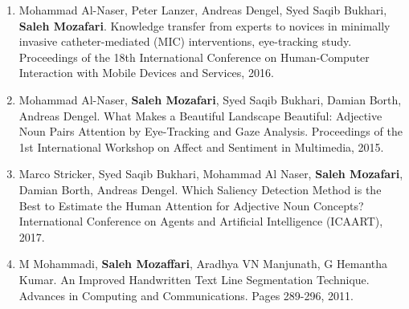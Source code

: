 \begin{enumerate}
	\item Mohammad Al-Naser, Peter Lanzer, Andreas Dengel, Syed Saqib Bukhari, \textbf{Saleh Mozafari}.  Knowledge transfer from experts to novices in minimally invasive catheter-mediated (MIC) interventions, eye-tracking study. Proceedings of the 18th International Conference on Human-Computer Interaction with Mobile Devices and Services, 2016.
	\item Mohammad Al-Naser, \textbf{Saleh Mozafari}, Syed Saqib Bukhari, Damian Borth, Andreas Dengel. What Makes a Beautiful Landscape Beautiful: Adjective Noun Pairs Attention by Eye-Tracking and Gaze Analysis. Proceedings of the 1st International Workshop on Affect and Sentiment in Multimedia, 2015.
	\item Marco Stricker, Syed Saqib Bukhari, Mohammad Al Naser, \textbf{Saleh Mozafari}, Damian Borth, Andreas Dengel.  Which Saliency Detection Method is the Best to Estimate the Human Attention for Adjective Noun Concepts? International Conference on Agents and Artificial Intelligence (ICAART), 2017.
	\item M Mohammadi, \textbf{Saleh Mozaffari}, Aradhya VN Manjunath, G Hemantha Kumar. An Improved Handwritten Text Line Segmentation Technique. Advances in Computing and Communications. Pages 289-296, 2011.
\end{enumerate}

